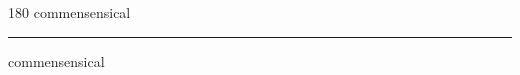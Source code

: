
\begin{frame}
\begin{center}
\begin{turn}{180}
{\fontsize{2.5cm}{1em}\selectfont commensensical}
\end{turn}
\vspace{1em}\par  
\hrule
\vspace{1em}\par  
{\fontsize{2.5cm}{1em}\selectfont commensensical}
\end{center}
\end{frame}
